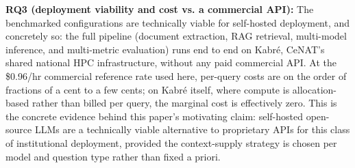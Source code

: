\documentclass[conference]{IEEEtran}
\begin{document}
\textbf{RQ3 (deployment viability and cost vs. a commercial API):}
The benchmarked configurations are technically viable for self-hosted deployment, and concretely so: the full pipeline (document extraction, RAG retrieval, multi-model inference, and multi-metric evaluation) runs end to end on Kabr\'e, CeNAT's shared national HPC infrastructure, without any paid commercial API.
At the \$0.96/hr commercial reference rate used here, per-query costs are on the order of fractions of a cent to a few cents; on Kabr\'e itself, where compute is allocation-based rather than billed per query, the marginal cost is effectively zero.
This is the concrete evidence behind this paper's motivating claim: self-hosted open-source \glspl{LLM} are a technically viable alternative to proprietary APIs for this class of institutional deployment, provided the context-supply strategy is chosen per model and question type rather than fixed a priori.
\end{document}
